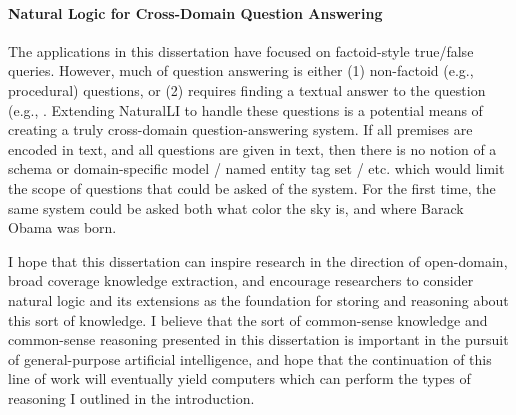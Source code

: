 \paragraph{Natural Logic for Cross-Domain Question Answering}
The applications in this dissertation have focused on factoid-style true/false queries.
However, much of question answering is either (1) non-factoid (e.g., procedural) questions, or
  (2) requires finding a textual answer to the question (e.g., .
Extending NaturalLI to handle these questions is a potential means of creating a truly cross-domain
  question-answering system.
If all premises are encoded in text, and all questions are given in text, then there is no notion of
  a schema or domain-specific model / named entity tag set / etc. which would limit the scope of questions
  that could be asked of the system.
For the first time, the same system could be asked both what color the sky is, and where Barack Obama was
  born.

I hope that this dissertation can inspire research in the direction of open-domain, broad coverage
  knowledge extraction, and encourage researchers to consider natural logic and its extensions
  as the foundation for storing and reasoning about this sort of knowledge.
I believe that the sort of common-sense knowledge and common-sense reasoning presented in this dissertation
  is important in the pursuit of general-purpose artificial intelligence, and hope that the continuation
  of this line of work will eventually yield computers which can perform the types of reasoning I outlined in
  the introduction.

